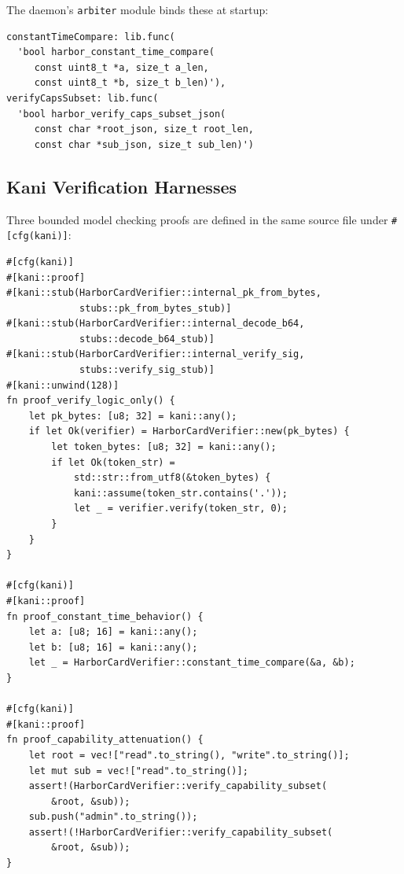 \documentclass[11pt,a4paper]{article}
\theoremstyle{definition}
\begin{document}
The daemon's \texttt{arbiter} module binds these at startup:

\begin{lstlisting}[caption={TypeScript FFI Binding (daemon-side Arbiter)}]
constantTimeCompare: lib.func(
  'bool harbor_constant_time_compare(
     const uint8_t *a, size_t a_len,
     const uint8_t *b, size_t b_len)'),
verifyCapsSubset: lib.func(
  'bool harbor_verify_caps_subset_json(
     const char *root_json, size_t root_len,
     const char *sub_json, size_t sub_len)')
\end{lstlisting}

\subsection{Kani Verification Harnesses}

Three bounded model checking proofs are defined in the same source file under \texttt{\#[cfg(kani)]}:

\begin{lstlisting}[style=rust, caption={Kani Proof Harnesses (Deployed Source)}]
#[cfg(kani)]
#[kani::proof]
#[kani::stub(HarborCardVerifier::internal_pk_from_bytes,
             stubs::pk_from_bytes_stub)]
#[kani::stub(HarborCardVerifier::internal_decode_b64,
             stubs::decode_b64_stub)]
#[kani::stub(HarborCardVerifier::internal_verify_sig,
             stubs::verify_sig_stub)]
#[kani::unwind(128)]
fn proof_verify_logic_only() {
    let pk_bytes: [u8; 32] = kani::any();
    if let Ok(verifier) = HarborCardVerifier::new(pk_bytes) {
        let token_bytes: [u8; 32] = kani::any();
        if let Ok(token_str) =
            std::str::from_utf8(&token_bytes) {
            kani::assume(token_str.contains('.'));
            let _ = verifier.verify(token_str, 0);
        }
    }
}

#[cfg(kani)]
#[kani::proof]
fn proof_constant_time_behavior() {
    let a: [u8; 16] = kani::any();
    let b: [u8; 16] = kani::any();
    let _ = HarborCardVerifier::constant_time_compare(&a, &b);
}

#[cfg(kani)]
#[kani::proof]
fn proof_capability_attenuation() {
    let root = vec!["read".to_string(), "write".to_string()];
    let mut sub = vec!["read".to_string()];
    assert!(HarborCardVerifier::verify_capability_subset(
        &root, &sub));
    sub.push("admin".to_string());
    assert!(!HarborCardVerifier::verify_capability_subset(
        &root, &sub));
}
\end{lstlisting}
\end{document}
